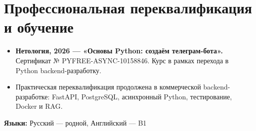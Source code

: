 \documentclass[a4paper,10pt]{article}
\newcommand{\resumeItem}[1]{
  \item\small{#1\vspace{-2pt}}
}
\newcommand{\resumeItemListStart}{\begin{itemize}[leftmargin=17pt,itemsep=1pt,topsep=3pt]}
\newcommand{\resumeItemListEnd}{\end{itemize}\vspace{-5pt}}
\begin{document}
\section{Профессиональная переквалификация и обучение}

\resumeItemListStart
\resumeItem{\textbf{Нетология, 2026 --- «Основы Python: создаём телеграм-бота».}
Сертификат № PYFREE-ASYNC-10158846. Курс в рамках перехода в Python backend-разработку.}
\resumeItem{Практическая переквалификация продолжена в коммерческой backend-разработке:
FastAPI, PostgreSQL, асинхронный Python, тестирование, Docker и RAG.}
\resumeItemListEnd


\vspace{2pt}
\textbf{Языки:} Русский --- родной, Английский --- B1
\end{document}
